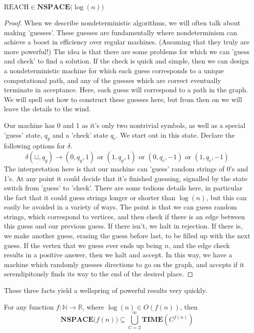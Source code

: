 \begin{theorem} 
$\textrm{REACH} \in \textbf{NSPACE($\log(n)$)}$
\end{theorem}
\begin{proof}
When we describe nondeterministic algorithms, we will often talk about making 'guesses'. These guesses are fundamentally where nondeterminism can achieve a boost in efficiency over regular machines. (Assuming that they truly are more powerful!) The idea is that there are some problems for which we can 'guess and check' to find a solution. If the check is quick and simple, then we can design a nondeterministic machine for which each guess corresponds to a unique computational path, and any of the guesses which are correct eventually terminate in acceptance. Here, each guess will correspond to a path in the graph. We will spell out how to construct these guesses here, but from then on we will leave the details to the wind. 
\par Our machine has 0 and 1 as it's only two nontrivial symbols, as well as a special 'guess' state, $q_g$ and a 'check' state $q_c$. We start out in this state. Declare the following options for $\delta$.
\[\delta(\sqcup, q_g) \to (0,q_g,1) \textrm{ or } (1,q_g,1) \textrm{ or } (0,q_c,-1) \textrm{ or } (1,q_c,-1) \]
The interpretation here is that our machine can 'guess' random strings of 0's and 1's. At any point it could decide that it's finished guessing, signalled by the state switch from 'guess' to 'check'. There are some tedious details here, in particular the fact that it could guess strings longer or shorter than $\log(n)$, but this can easily be avoided in a variety of ways. The point is that we can guess random strings, which correspond to vertices, and then check if there is an edge between this guess and our previous guess. If there isn't, we halt in rejection. If there is, we make another guess, erasing the guess before last, to be filled up with the next guess. If the vertex that we guess ever ends up being $n$, and the edge check results in a positive answer, then we halt and accept. In this way, we have a machine which randomly guesses directions to go on the graph, and accepts if it serendipitously finds its way to the end of the desired place.
\end{proof}
These three facts yield a wellspring of powerful results very quickly.
\begin{theorem}
For any function $f:\mathbb{N} \to \mathbb{R}$, where $\log(n) \in O(f(n))$, then
    \[ \textbf{NSPACE($f(n)$)} \subseteq \bigcup_{C=2}^{\infty}\textbf{TIME$(C^{f(n)})$} \]
\end{theorem}
